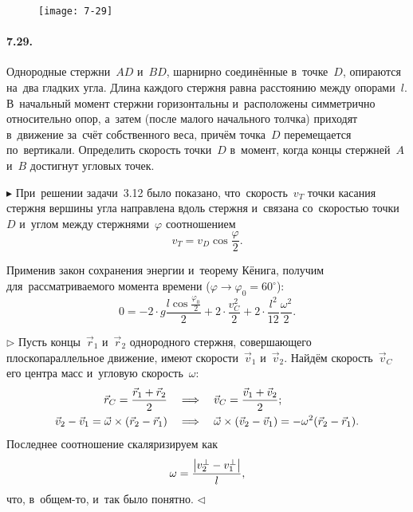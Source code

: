 \documentclass{weekly}
\begin{document}

\begin{wrapfigure}{r}{.28\textwidth}
\texttt{[image: 7-29]}
\end{wrapfigure}
\paragraph{7.29.} Однородные стержни~$AD$ и~$BD$, шарнирно соединённые
в~точке~$D$, опираются на~два гладких угла. Длина каждого стержня
равна расстоянию между опорами~$l$. В~начальный момент стержни
горизонтальны и~расположены симметрично относительно опор,
а~затем (после малого начального толчка) приходят в~движение
за~счёт собственного веса, причём точка~$D$ перемещается по~вертикали.
Определить скорость точки~$D$ в~момент, когда концы стержней~$A$ и~$B$
достигнут угловых точек.

$\blacktriangleright$ При~решении задачи~3.12 было показано,
что~скорость~$v_T$ точки касания стержня вершины угла
направлена вдоль стержня и~связана со~скоростью точки~$D$
и~углом между стержнями~$\varphi$ соотношением
\begin{equation}
    v_T = v_D \cos\frac\varphi 2.
\end{equation}

Применив закон сохранения энергии и~теорему Кёнига, получим
для~рассматриваемого момента времени ($\varphi\to\varphi_0 = 60^\circ$):
\begin{equation}
    0 = -2 \cdot g\frac{l \cos\frac{\varphi_0}{2}}{2} +
            2 \cdot \frac{v_C^2}{2} +
            2 \cdot \frac{l^2}{12} \frac{\omega^2}{2}.
    \label{7.29:energy}
\end{equation}

$\triangleright$ Пусть концы~$\vec r_1$ и~$\vec r_2$ однородного стержня,
совершающего плоскопараллельное движение, имеют скорости~$\vec v_1$
и~$\vec v_2$. Найдём скорость~$\vec v_C$ его центра масс
и~угловую скорость~$\omega$:
\begin{align}
    \vec r_C = \dfrac{\vec r_1 + \vec r_2}{2}
&\quad \Longrightarrow \quad
    \vec v_C = \dfrac{\vec v_1 + \vec v_2}{2};
\\
    \vec v_2 - \vec v_1 = \vec\omega \times (\vec r_2 - \vec r_1)
&\quad \Longrightarrow \quad
    \vec\omega \times (\vec v_2 - \vec v_1)
        = -\omega^2 (\vec r_2 - \vec r_1).
\end{align}
Последнее соотношение скаляризируем как
\begin{equation}
    \omega = \frac{\left| v_2^{\perp} - v_1^{\perp} \right|}{l},
\end{equation}
что, в~общем-то, и~так было понятно. \hfill $\triangleleft$
\end{document}
